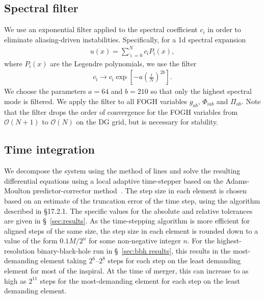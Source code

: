 \begin{bibunit}[unsrtnat]
\subsection{Spectral filter\label{sec:gh spectral filter}}
We use an exponential filter applied to the spectral coefficient $c_i$ in order
to eliminate aliasing-driven instabilities. Specifically, for a 1d spectral
expansion
\begin{align}
  \label{eq:u spectral expansion}
  u(x)=\sum_{\breve{\imath}=0}^{N}c_{\breve{\imath}} P_{\breve{\imath}}(x),
\end{align}
where $P_{\breve{\imath}}(x)$ are the Legendre polynomials, we use the filter
\begin{align}
  \label{eq:exponential filter}
  c_{\breve{\imath}} \to c_{\breve{\imath}}
  \exp\left[-a\left(\frac{i}{N}\right)^{2b}\right].
\end{align}
We choose the parameters $a=64$ and $b=210$ so that only the highest
spectral mode is filtered. We apply the filter to all FOGH variables $g_{ab}$,
$\Phi_{iab}$ and $\Pi_{ab}$. Note that the filter drops the order of convergence
for the FOGH variables from $\mathcal{O}(N+1)$ to $\mathcal{O}(N)$ on the DG
grid, but is necessary for stability.

\subsection{Time integration\label{sec:time integration}}
We decompose the system using the method of lines and solve the resulting
differential equations using a local adaptive time-stepper based on the
Adams-Moulton predictor-corrector method~\cite{ThroweLTSAM}.  The
step size in each element is chosen based on an estimate of the truncation error
of the time step, using the algorithm described in \cite{NumericalRecipes}
\S17.2.1. The specific values for the absolute and relative tolerances are
given in \S~\ref{sec:results}. As the time-stepping algorithm
is more efficient for aligned steps of the same size, the step size in each
element is rounded down to a value of the form $0.1 M / 2^n$ for some
non-negative integer $n$.  For the highest-resolution binary-black-hole run in
\S~\ref{sec:bbh results}, 
this results in the most-demanding element taking $2^6$--$2^8$ steps for each
step on the least demanding element for most of the inspiral. At the time of
merger, this can increase to as high as $2^{11}$ steps for the most-demanding
element for each step on the least demanding element.


\end{bibunit}
